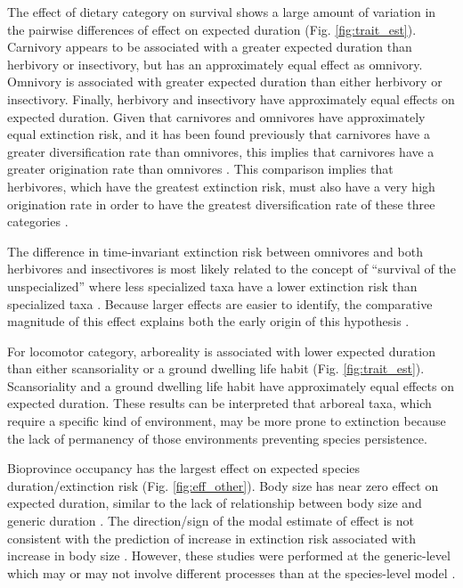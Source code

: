 \documentclass[12pt]{article}
\begin{document}
The effect of dietary category on survival shows a large amount of variation in the pairwise differences of effect on expected duration (Fig. \ref{fig:trait_est}). Carnivory appears to be associated with a greater expected duration than herbivory or insectivory, but has an approximately equal effect as omnivory. Omnivory is associated with greater expected duration than either herbivory or insectivory. Finally, herbivory and insectivory have approximately equal effects on expected duration. 
Given that carnivores and omnivores have approximately equal extinction risk, and it has been found previously that carnivores have a greater diversification rate than omnivores, this implies that carnivores have a greater origination rate than omnivores \cite{Price2012}. This comparison implies that herbivores, which have the greatest extinction risk, must also have a very high origination rate in order to have the greatest diversification rate of these three categories \cite{Price2012}. 

The difference in time-invariant extinction risk between omnivores and both herbivores and insectivores is most likely related to the concept of ``survival of the unspecialized'' where less specialized taxa have a lower extinction risk than specialized taxa \cite{Liow2004a,Simpson1944}. Because larger effects are easier to identify, the comparative magnitude of this effect explains both the early origin of this hypothesis \cite{Simpson1944}. 

For locomotor category, arboreality is associated with lower expected duration than either scansoriality or a ground dwelling life habit (Fig. \ref{fig:trait_est}). Scansoriality and a ground dwelling life habit have approximately equal effects on expected duration. These results can be interpreted that arboreal taxa, which require a specific kind of environment, may be more prone to extinction because the lack of permanency of those environments preventing species persistence. 

Bioprovince occupancy has the largest effect on expected species duration/extinction risk (Fig. \ref{fig:eff_other}). Body size has near zero effect on expected duration, similar to the lack of relationship between body size and generic duration \cite{Tomiya2013}. The direction/sign of the modal estimate of effect is not consistent with the prediction of increase in extinction risk associated with increase in body size \cite{Liow2008}. However, these studies were performed at the generic-level which may or may not involve different processes than at the species-level model \cite{Tomiya2013,Liow2008}.
\end{document}

